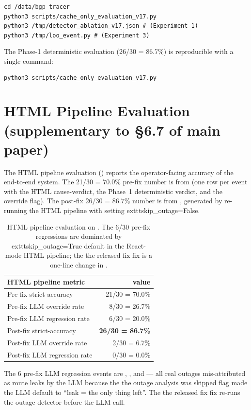 \documentclass[sigcomm,nonatbib]{acmart}
\begin{document}
\begin{verbatim}
cd /data/bgp_tracer
python3 scripts/cache_only_evaluation_v17.py
python3 /tmp/detector_ablation_v17.json # (Experiment 1)
python3 /tmp/loo_event.py # (Experiment 3)
\end{verbatim}

The Phase-1 deterministic evaluation (26/30 = 86.7\%) is
reproducible with a single command:
\begin{verbatim}
python3 scripts/cache_only_evaluation_v17.py
\end{verbatim}

\section{HTML Pipeline Evaluation (supplementary to \S6.7 of main paper)}
\label{sec:supp-html}

The HTML pipeline evaluation () reports
the operator-facing accuracy of the end-to-end system. The
21/30 = 70.0\% pre-fix number is from
 (one row
per event with the HTML cause-verdict, the Phase~1
deterministic verdict, and the override flag). The
post-fix 26/30 = 86.7\% number is from
, generated
by re-running the HTML pipeline with
setting 	exttt{skip\_outage=False}.

\begin{table}[h]
\centering\small
\begin{tabular}{lr}
\hline
HTML pipeline metric & value \\ \hline
Pre-fix strict-accuracy & 21/30 = 70.0\% \\
Pre-fix LLM override rate & 8/30 = 26.7\% \\
Pre-fix LLM regression rate & 6/30 = 20.0\% \\
Post-fix strict-accuracy & \textbf{26/30 = 86.7\%} \\
Post-fix LLM override rate & 2/30 = 6.7\% \\
Post-fix LLM regression rate & 0/30 = 0.0\% \\
\hline
\end{tabular}

\caption{HTML pipeline evaluation on . The 6/30
pre-fix regressions are dominated by
\protectthe 	exttt{skip\_outage=True} default in the React-mode HTML
pipeline; the the released fix fix is a one-line change in
\protect.}
\label{tab:supp-html}
\end{table}

The 6 pre-fix LLM regression events are
,
, and
 --- all real outages
mis-attributed as route leaks by the LLM because the
the outage analysis was skipped flag made the LLM
default to ``leak = the only thing left''. The the released fix
fix re-runs the outage detector before the LLM call.
\end{document}
